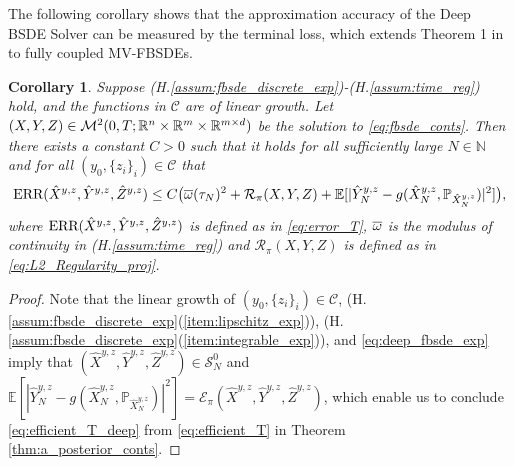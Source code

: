 \documentclass[11pt]{article}
\numberwithin{equation}{section}
\newtheorem{Corollary}[Theorem]{Corollary}
\theoremstyle{definition}
\theoremstyle{remark}
\def\ol{\overline} \def\cl{\centerline}   \def\ul{\underline}
\def\l{\label}  \def\f{\frac}  \def\fa{\forall}
\def\cC{\mathcal{C}}
\def\cE{\mathcal{E}}
\def\cM{\mathcal{M}}
\def\cR{\mathcal{R}}
\def\cS{\mathcal{S}}
\def\sE{{\mathbb{E}}}
\def\sN{{\mathbb{N}}}
\def\sP{\mathbb{P}}
\def\sR{{\mathbb R}}
\newcommand{\err}{\textnormal{ERR}}
\begin{document}
The following corollary 
shows that the approximation accuracy  of the  Deep BSDE Solver
can be measured by the terminal loss,
which extends Theorem 1  in \cite{han2018} to fully coupled MV-FBSDEs.
\begin{Corollary}\l{cor:deep_bsde}
Suppose (H.\ref{assum:fbsde_discrete_exp})-(H.\ref{assum:time_reg}) hold,
and the functions in $\cC$ are of linear growth.
Let
$(X,Y, Z)\in \cM^2(0,T;\sR^n\t \sR^m\t \sR^{m\t d })$ be the solution to  \eqref{eq:fbsde_conts}.
Then 
there exists a constant $C>0$ such that 
it holds for  all sufficiently large $N\in \sN$
and 
for all 
$(y_0,\{z_i\}_{i})\in \cC$
that
\begin{align}\l{eq:efficient_T_deep}
\err(\hat{X}^{y,z},\hat{Y}^{y,z},\hat{Z}^{y,z})
\le 
C\big(\ol{\om}(\tau_N)^2
+
\cR_\pi(X,Y,Z)
+\sE[|\hat{Y}^{y,z}_N-g(\hat{X}^{y,z}_N,\sP_{\hat{X}^{y,z}_N})|^2]
\big),
\end{align}
where 
$\err(\hat{X}^{y,z},\hat{Y}^{y,z},\hat{Z}^{y,z})$ is 
defined as in \eqref{eq:error_T},
$\ol{\om}$ is the modulus of continuity in (H.\ref{assum:time_reg})
and $\cR_\pi(X,Y,Z)$ is 
 defined as in \eqref{eq:L2_Regularity_proj}.
\end{Corollary}
\begin{proof}
Note that 
 the linear growth of $(y_0,\{z_i\}_i)\in \cC$,
 (H.\ref{assum:fbsde_discrete_exp}(\ref{item:lipschitz_exp})),
 (H.\ref{assum:fbsde_discrete_exp}(\ref{item:integrable_exp})), 
and \eqref{eq:deep_fbsde_exp} 
imply that 
$(\hat{X}^{y,z},\hat{Y}^{y,z},\hat{Z}^{y,z})\in \cS_N^0$
and $\sE[|\hat{Y}^{y,z}_N-g(\hat{X}^{y,z}_N,\sP_{\hat{X}^{y,z}_N})|^2]=\cE_\pi(\hat{X}^{y,z},\hat{Y}^{y,z},\hat{Z}^{y,z})$,
which enable us to conclude \eqref{eq:efficient_T_deep} from
 \eqref{eq:efficient_T} in Theorem \ref{thm:a_posterior_conts}.
\end{proof}
\end{document}
